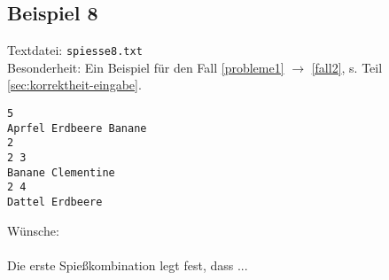 \subsection{Beispiel 8}\label{example:8}
Textdatei: \texttt{spiesse8.txt}\\
Besonderheit: Ein Beispiel für den Fall \ref{probleme1} $\rightarrow$ \ref{fall2}, s. Teil \ref{sec:korrektheit-eingabe}.
\begin{verbatim}
5
Aprfel Erdbeere Banane
2
2 3
Banane Clementine
2 4
Dattel Erdbeere
\end{verbatim}

\noindent
Wünsche: \\

\noindent
{}\\

Die erste Spießkombination legt fest, dass ...
